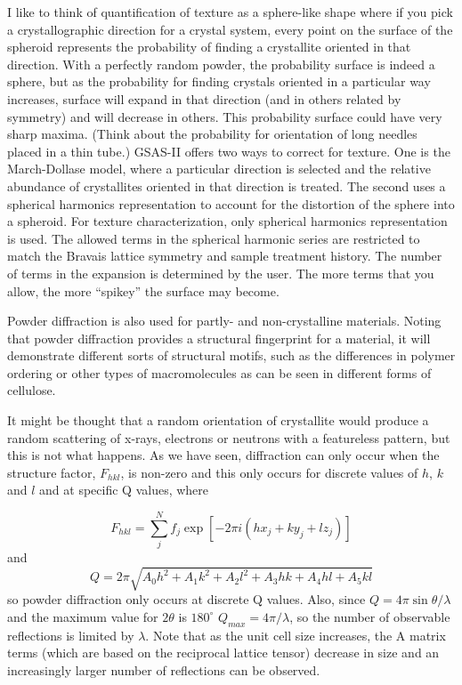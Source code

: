 \label{ref:PO}I like to think of quantification of texture as a sphere-like shape where if you pick a crystallographic direction for a crystal system, every point on the surface of the spheroid represents the probability of finding a crystallite oriented in that direction. With a perfectly random powder, the probability surface is indeed a sphere, but as the probability for finding crystals oriented in a particular way increases, surface will expand in that direction (and in others related by symmetry) and will decrease in others. This probability surface could have very sharp maxima. (Think about the probability for orientation of long needles placed in a thin tube.) GSAS-II offers two ways to correct for texture. One is the March-Dollase model, where a particular direction is selected and the relative abundance of crystallites oriented in that direction is treated. The second uses a spherical harmonics representation to account for the distortion of the sphere into a spheroid. For texture characterization, only spherical harmonics representation is used. The allowed terms in the spherical harmonic series are restricted to match the Bravais lattice symmetry and sample treatment history. The number of terms in the expansion is determined by the user. The more terms that you allow, the more ``spikey'' the surface may become.

Powder diffraction is also used for partly- and non-crystalline materials. Noting that powder diffraction provides a structural fingerprint for a material, it will demonstrate different sorts of structural motifs, such as the differences in polymer ordering or other types of macromolecules as can be seen in different forms of cellulose. 

It might be thought that a random orientation of crystallite would produce a random scattering of x-rays, electrons or neutrons with a featureless pattern, but this is not what happens. 
As we have seen, diffraction can only occur when the structure factor, $F_{hkl}$, is non-zero and this only occurs for discrete values of $h$, $k$ and $l$ and at specific Q values, where 

$$F_{hkl}=\sum_j^N f_j \exp⁡[-2\pi i(hx_j + ky_j + lz_j)]$$
and 
$$Q = 2 \pi \sqrt {A_0 h^2 + A_1 k^2 + A_2 l^2 + A_3 hk + A_4 hl + A_5 kl}$$ 
so powder diffraction only occurs at discrete Q values. 
Also, since $Q =  4 \pi \sin\theta/\lambda$ and the maximum value for $2\theta$ is $180^\circ$  $Q_{max} =  4 \pi /\lambda$, so the number of observable reflections is limited by $\lambda$. Note that as the unit cell size increases, the A matrix terms (which are based on the reciprocal lattice tensor) decrease in size and an increasingly larger number of reflections can be observed. 


